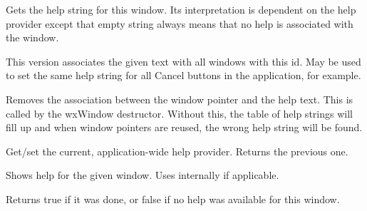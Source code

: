 Gets the help string for this window. Its interpretation is dependent on the help provider
except that empty string always means that no help is associated with
the window.


This version associates the given text with all windows with this id.
May be used to set the same help string for all Cancel buttons in
the application, for example.

\label{wxhelpproviderremovehelp}


Removes the association between the window pointer and the help text. This is
called by the wxWindow destructor. Without this, the table of help strings will fill up
and when window pointers are reused, the wrong help string will be found.

\label{wxhelpproviderset}


Get/set the current, application-wide help provider. Returns
the previous one.

\label{wxhelpprovidershowhelp}


Shows help for the given window. Uses  internally if
applicable.

Returns true if it was done, or false if no help was available
for this window.


